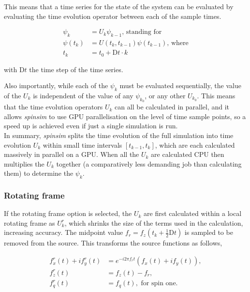 \documentclass{jors}
\begin{document}
			This means that a time series for the state of the system can be evaluated by evaluating the time evolution operator between each of the sample times.
			
			\begin{align*}
				\psi_k &= U_k\psi_{k-1}\textrm{, standing for}\\
				\psi(t_{k}) &= U(t_{k}, t_{k-1})\psi(t_{k-1})\textrm{, where}\\
				t_k &= t_0 + \mathrm{D}t\cdot k
			\end{align*}
			
			with \(\mathrm{D}t\) the time step of the time series.

			Also importantly, while each of the \(\psi_k\) must be evaluated sequentially, the value of the \(U_k\) is independent of the value of any \(\psi_{k_0}\), or any other \(U_{k_0}\). This means that the time evolution operators \(U_k\) can all be calculated in parallel, and it allows \emph{spinsim} to use GPU parallelisation on the level of time sample points, so a speed up is achieved even if just a single simulation is run.\\

			In summary, \emph{spinsim} splits the time evolution of the full simulation into time evolution \(U_k\) within small time intervals \([t_{k - 1}, t_{k}]\), which are each calculated massively in parallel on a GPU. When all the \(U_k\) are calculated CPU then multiplies the \(U_k\) together (a comparatively less demanding job than calculating them) to determine the \(\psi_k\).

		\subsubsection*{Rotating frame}
			If the rotating frame option is selected, the \(U_k\) are first calculated within a local rotating frame as \(U^r_k\), which shrinks the size of the terms used in the calculation, increasing accuracy. The midpoint value \(f_r = f_z(t_k + \frac12\mathrm{D}t)\) is sampled to be removed from the source. This transforms the source functions as follows,
			
			\begin{align*}
				f^r_x(t) + if^r_y(t) &= e^{-i 2\pi f_r t}(f_x(t) + if_y(t)),\\
				f^r_z(t) &= f_z(t) - f_r,\\
				f^r_q(t) &= f_q(t), \textrm{ for spin one.}\\
			\end{align*}
			
\end{document}
